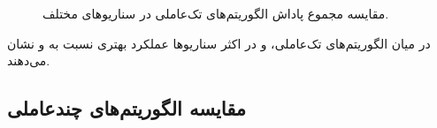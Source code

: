 \begin{figure}[H]
	\caption{مقایسه مجموع پاداش الگوریتم‌های تک‌عاملی در سناریوهای مختلف.}
	\label{fig:all_solo_robustness_violin}
\end{figure}

در میان الگوریتم‌های تک‌عاملی،  و  در اکثر سناریوها عملکرد بهتری نسبت به  و  نشان می‌دهند.

\subsection{مقایسه الگوریتم‌های چندعاملی}

